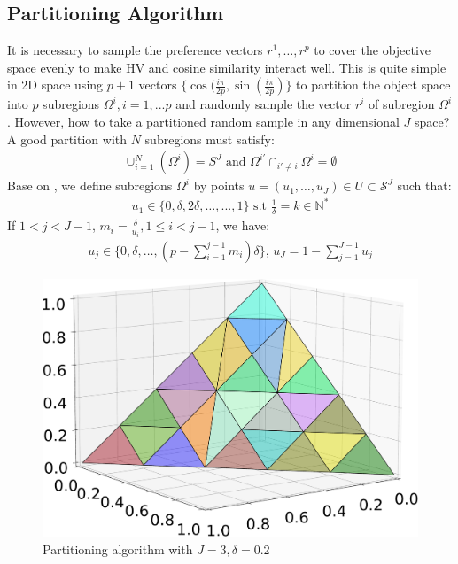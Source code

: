 \documentclass[letterpaper]{article} %
\begin{document}
\subsection{Partitioning Algorithm}
\label{sst:partition}
It is necessary to sample the preference vectors $r^1,\dots, r^p$ to cover the objective space evenly to make HV and cosine similarity interact well. This is quite simple in 2D space using $p+1$ vectors $\{\cos(\frac{i\pi}{2p}, \sin(\frac{i\pi}{2p}) \}$ to partition the object space into $p$ subregions $\Omega^i, i=1,...p$ and randomly sample the vector $r^i$ of subregion $\Omega^i$. However, how to take a partitioned random sample in any dimensional $J$ space? A good partition with $N$ subregions must satisfy:
\begin{align}
    \cup_{i=1}^N (\Omega^i)= S^J \text{ and }  \Omega^{i'} \cap_{i' \neq i} \Omega^i = \emptyset
\end{align}
Base on \cite{das}, we define subregions $\Omega^i$ by points $u=(u_1, \dots, u_J) \in U \subset \mathcal{S}^J$ such that:
\begin{align}
    u_1 \in \{0, \delta, 2\delta, \dots, ..., 1\} \text{ s.t }  \frac{1}{\delta}=k \in \mathbb{N}^* 
\end{align}
If $1<j<J-1$, $m_i = \frac{\delta}{u_i}, 1 \leq i<j-1$, we have:
\begin{align}
    u_j \in \{0, \delta, \dots, (p-\sum_{i=1}^{j-1}m_i)\delta\} \text{, }  u_J = 1 - \sum_{j=1}^{J-1}u_j
\end{align}
\begin{figure}[!htb]
    \centering
    \includegraphics[width=0.8\columnwidth]{figures/Partition_resize.pdf}
    \caption{Partitioning algorithm with $J=3, \delta=0.2$}
    \label{fig:partition_result}
\end{figure}
\end{document}
